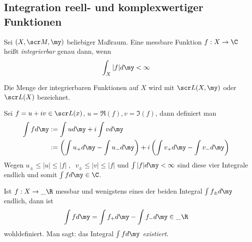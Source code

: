 \documentclass[a4paper,10pt]{scrartcl}
\begin{document}
\subsection{Integration reell- und komplexwertiger Funktionen}

\begin{df*}
	Sei $(X,\scr M, \my)$ beliebiger Maßraum.
	Eine messbare Funktion $f:X\to \C$ heißt \emph{integrierbar} genau dann, wenn
	\[
		\int_X |f| d\my < \infty
	\]

	Die Menge der integrierbaren Funktionen auf $X$ wird mit $\scr L(X,\my)$ oder $\scr L(X)$ bezeichnet.

	Sei $f=u +iv \in \scr L(x)$, $u = \Re(f), v=\Im(f)$, dann definiert man
	\begin{align*}
		\int fd\my &:= \int ud\my + i\int vd\my\\
		&:= \left(\int u_+d\my - \int u_- d\my\right) + i\left(\int v_+ d\my - \int v_- d\my\right)
	\end{align*}
	Wegen $u_\pm \le |u| \le |f| \;,\;\; v_\pm \le |v| \le |f|$ und $\int |f|d\my < \infty$ sind diese vier Integrale endlich und somit $\int fd\my \in \C$.
	
	Ist $f:X\to \_\R$ messbar und wenigstens eines der beiden Integral $\int f_\pm d\my$ endlich, dann ist
	\[
		\int fd\my = \int f_+ d\my - \int f_- d\my \in \_\R
	\]
	wohldefiniert.
	Man sagt: das Integral $\int fd\my$ \emph{existiert}.
\end{df*}
\end{document}
